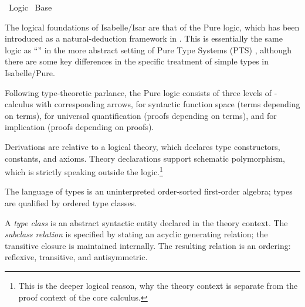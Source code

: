 %
\begin{isabellebody}%
\def\isabellecontext{Logic}%
%
\isadelimtheory
%
\endisadelimtheory
%
\isatagtheory
{}\isamarkupfalse%
\ Logic\isanewline
{}\ Base\isanewline
{}%
\endisatagtheory
{\isafoldtheory}%
%
\isadelimtheory
%
\endisadelimtheory
%
\isamarkuptrue%
%
\begin{isamarkuptext}%
The logical foundations of Isabelle/Isar are that of the Pure logic,
  which has been introduced as a natural-deduction framework in
  \cite{paulson700}.  This is essentially the same logic as ``'' in the more abstract setting of Pure Type Systems (PTS)
  \cite{Barendregt-Geuvers:2001}, although there are some key
  differences in the specific treatment of simple types in
  Isabelle/Pure.

  Following type-theoretic parlance, the Pure logic consists of three
  levels of \isa{{\isasymlambda}}-calculus with corresponding arrows, \isa{{\isasymRightarrow}} for syntactic function space (terms depending on terms), \isa{{\isasymAnd}} for universal quantification (proofs depending on terms), and
  \isa{{\isasymLongrightarrow}} for implication (proofs depending on proofs).

  Derivations are relative to a logical theory, which declares type
  constructors, constants, and axioms.  Theory declarations support
  schematic polymorphism, which is strictly speaking outside the
  logic.\footnote{This is the deeper logical reason, why the theory
  context \isa{{\isasymTheta}} is separate from the proof context \isa{{\isasymGamma}}
  of the core calculus.}%
\end{isamarkuptext}%
\isamarkuptrue%
%
\isamarkuptrue%
%
\begin{isamarkuptext}%
The language of types is an uninterpreted order-sorted first-order
  algebra; types are qualified by ordered type classes.

  \medskip A \emph{type class} is an abstract syntactic entity
  declared in the theory context.  The \emph{subclass relation}  is specified by stating an acyclic
  generating relation; the transitive closure is maintained
  internally.  The resulting relation is an ordering: reflexive,
  transitive, and antisymmetric.


\end{isamarkuptext}
\end{isabellebody}
